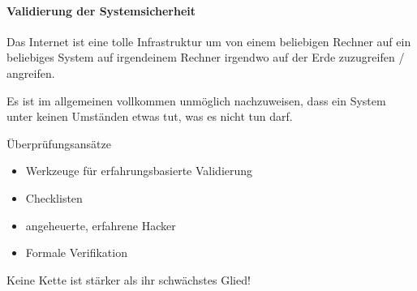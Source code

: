 \paragraph{Validierung der Systemsicherheit}
Das Internet ist eine tolle Infrastruktur um von einem beliebigen Rechner auf ein beliebiges System auf irgendeinem Rechner irgendwo auf der Erde zuzugreifen / angreifen.

Es ist im allgemeinen vollkommen unmöglich nachzuweisen, dass ein System unter keinen Umständen etwas tut, was es nicht tun darf.

Überprüfungsansätze

\begin{itemize}
\item Werkzeuge für erfahrungsbasierte Validierung
\item Checklisten
\item angeheuerte, erfahrene Hacker
\item Formale Verifikation
\end{itemize}

Keine Kette ist stärker als ihr schwächstes Glied!






